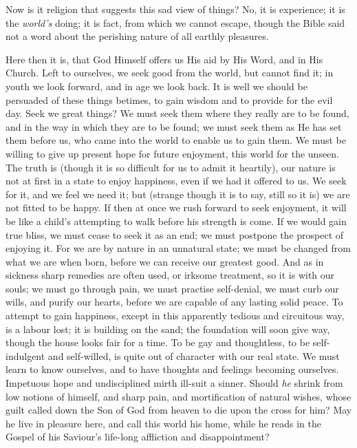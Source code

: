 Now is it religion that suggests this sad view of things? No, it is
experience; it is the \emph{world's} doing; it is fact, from which we
cannot escape, though the Bible said not a word about the perishing
nature of all earthly pleasures.

Here then it is, that God Himself offers us His aid by His Word,
and in His Church. Left to ourselves, we seek good from the world, but
cannot find it; in youth we look forward, and in age we look back. It
is well we should be persuaded of these things betimes, to gain wisdom
and to provide for the evil day. Seek we great things? We must seek
them where they really are to be found, and in the way in which they
are to be found; we must seek them as He has set them before us, who
came into the world to enable us to gain them. We must be willing to
give up present hope for future enjoyment, this world for the unseen.
The truth is (though it is so difficult for us to admit it heartily),
our nature is not at first in a state to enjoy happiness, even if we
had it offered to us. We seek for it, and we feel we need it; but
(strange though it is to say, still so it is) we are not fitted to be
happy. If then at once we rush forward to seek enjoyment, it will be
like a child's attempting to walk before his strength is come. If we
would gain true bliss, we must cease to seek it as an end; we must
postpone the prospect of enjoying it. For we are by nature in an
unnatural state; we must be changed from what we are when born, before
we can receive our greatest good. And as in sickness sharp remedies
are often used, or irksome treatment, so it is with our souls; we must
go through pain, we must practise self-denial, we must curb our wills,
and purify our hearts, before we are capable of any lasting solid
peace. To attempt to gain happiness, except in this apparently tedious
and circuitous way, is a labour lost; it is building on the sand; the
foundation will soon give way, though the house looks fair for a time.
To be gay and thoughtless, to be self-indulgent and self-willed, is
quite out of character with our real state. We must learn to know
ourselves, and to have thoughts and feelings becoming ourselves.
Impetuous hope and undisciplined mirth ill-suit a sinner. Should \emph{he}
shrink from low notions of himself, and sharp pain, and mortification
of natural wishes, whose guilt called down the Son of God from heaven
to die upon the cross for him? May he live in pleasure here, and call
this world his home, while he reads in the Gospel of his Saviour's
life-long affliction and disappointment?

